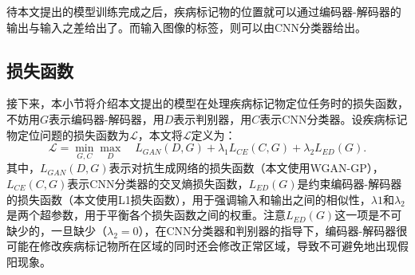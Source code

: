 待本文提出的模型训练完成之后，疾病标记物的位置就可以通过编码器-解码器的输出与输入之差给出了。而输入图像的标签，则可以由CNN分类器给出。
\subsection{损失函数}\label{subsec:loss_func}
接下来，本小节将介绍本文提出的模型在处理疾病标记物定位任务时的损失函数，不妨用$G$表示编码器-解码器，用$D$表示判别器，用$C$表示CNN分类器。设疾病标记物定位问题的损失函数为$\mathcal{L}$，本文将$\mathcal{L}$定义为：
\begin{equation}\label{equ:model_loss_func}
\mathcal{L}=\min _{G, C} \max _{D} \quad L_{GAN}(D, G)+\lambda_{1} L_{C E}(C, G)+\lambda_{2} L_{E D}(G).
\end{equation}
其中，$L_{GAN}(D,G)$表示对抗生成网络的损失函数（本文使用WGAN-GP），$L_{CE}(C, G)$表示CNN分类器的交叉熵损失函数，$L_{E D}(G)$是约束编码器-解码器的损失函数（本文使用L1损失函数），用于强调输入和输出之间的相似性，$\lambda{1}$和$\lambda_{2}$是两个超参数，用于平衡各个损失函数之间的权重。注意$L_{E D}(G)$这一项是不可缺少的，一旦缺少（$\lambda_{2}=0$），在CNN分类器和判别器的指导下，编码器-解码器很可能在修改疾病标记物所在区域的同时还会修改正常区域，导致不可避免地出现假阳现象。

